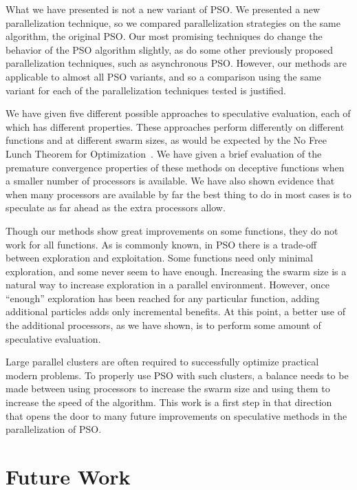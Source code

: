 \documentclass[ms,electronic,twosidetoc,letterpaper,chaptercenter,parttop,equalmargins]{byumsphd}
\begin{document}
What we have presented is not a new variant of PSO.  We presented a new
parallelization technique, so we compared parallelization strategies on the
same algorithm, the original PSO.  Our most promising techniques do change the
behavior of the PSO algorithm slightly, as do some other previously proposed
parallelization techniques, such as asynchronous PSO.  However, our methods are
applicable to almost all PSO variants, and so a comparison using the same
variant for each of the parallelization techniques tested is justified.

We have given five different possible approaches to speculative evaluation,
each of which has different properties.  These approaches perform differently
on different functions and at different swarm sizes, as would be expected by
the No Free Lunch Theorem for
Optimization~\citep{wolpert-1997-nfl-for-optimization}.  We have given a brief
evaluation of the premature convergence properties of these methods on
deceptive functions when a smaller number of processors is available.  We have
also shown evidence that when many processors are available by far the best
thing to do in most cases is to speculate as far ahead as the extra processors
allow.

Though our methods show great improvements on some functions, they do not work
for all functions.  As is commonly known, in PSO there is a trade-off between
exploration and exploitation.  Some functions need only minimal exploration,
and some never seem to have enough.  Increasing the swarm size is a natural way
to increase exploration in a parallel environment.  However, once ``enough''
exploration has been reached for any particular function, adding additional
particles adds only incremental benefits.  At this point, a better use of the
additional processors, as we have shown, is to perform some amount of
speculative evaluation.

Large parallel clusters are often required to successfully optimize practical
modern problems.  To properly use PSO with such clusters, a balance needs to be
made between using processors to increase the swarm size and using them to
increase the speed of the algorithm.  This work is a first step in that
direction that opens the door to many future improvements on speculative
methods in the parallelization of PSO.

\chapter{Future Work}
\label{sec:future}
\end{document}
